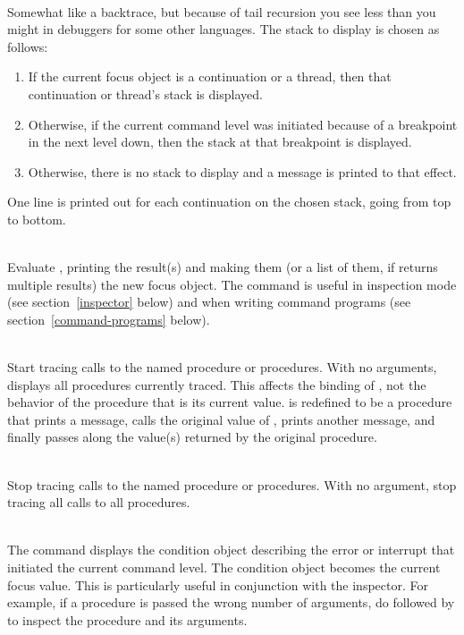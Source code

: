 \begin{description}
\item {}\\
    Somewhat like a backtrace, but because of tail recursion you see
    less than you might in debuggers for some other languages.
    The stack to display is chosen as follows:
\begin{enumerate}
    \item If the current focus object is a continuation or a thread,
       then that continuation or thread's stack is displayed.
    \item Otherwise, if the current command level was initiated because of
       a breakpoint in the next level down, then the stack at that
       breakpoint is displayed.
    \item Otherwise, there is no stack to display and a message is printed
       to that effect.
\end{enumerate}
    One line is printed out for each continuation on the chosen stack,
    going from top to bottom.

\item {}\\
    Evaluate , printing the result(s) and making them
    (or a list of them, if  returns multiple results)
    the new focus object.
    The  command is useful in inspection mode (see
    section~\ref{inspector} below) and when writing
    command programs (see section~\ref{command-programs} below).

\item {}\\
    Start tracing calls to the named procedure or procedures.
    With no arguments, displays all procedures currently traced.
    This affects the binding of , not the behavior of the
    procedure that is its current value.   is redefined
    to be a procedure that prints a message,
    calls the original value of , prints another
    message, and finally passes along the value(s) returned by the
    original procedure.

\item {}\\
    Stop tracing calls to the named procedure or procedures.
    With no argument, stop tracing all calls to all procedures.

\item {}\\
    The  command displays the condition object
    describing the error or interrupt that initiated the current
    command level.  The condition object becomes the current focus
    value.  This is particularly useful in conjunction with
    the inspector.  For example, if a procedure is passed the wrong number of
    arguments, do  followed by
      to inspect the
    procedure and its arguments.


\end{description}
